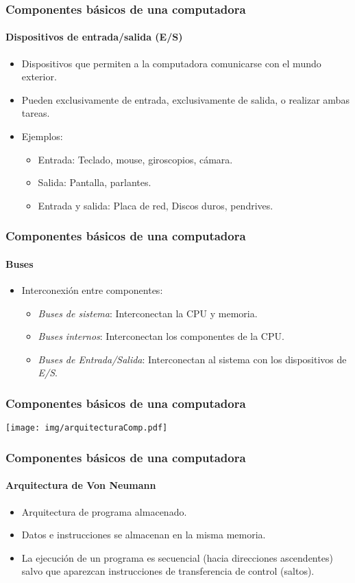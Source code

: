 \documentclass[11pt,a4paper,spanish]{beamer}
\begin{document}
\begin{frame}
    \frametitle{Componentes básicos de una computadora}
    \framesubtitle{Dispositivos de entrada/salida (E/S)}
    \pause
    \begin{itemize}
        \item Dispositivos que permiten a la computadora comunicarse con el
            mundo exterior. \pause
        \item Pueden exclusivamente de entrada, exclusivamente de salida, o
            realizar ambas tareas. \pause
        \item Ejemplos:
        \begin{itemize}
            \item Entrada: Teclado, mouse, giroscopios, cámara.
            \item Salida: Pantalla, parlantes.
            \item Entrada y salida: Placa de red, Discos duros, pendrives.
        \end{itemize}
    \end{itemize}
\end{frame}

\begin{frame}
    \frametitle{Componentes básicos de una computadora}
    \framesubtitle{Buses}
    \pause
    \begin{itemize}
        \item Interconexión entre componentes:\pause
        \begin{itemize}
            \item \emph{Buses de sistema}: Interconectan la CPU y memoria.
            \item \emph{Buses internos}: Interconectan los componentes de la
                CPU.
            \item \emph{Buses de Entrada/Salida}: Interconectan al sistema con
                los dispositivos de \emph{E/S}.
        \end{itemize}
    \end{itemize}
\end{frame}

\begin{frame}
    \frametitle{Componentes básicos de una computadora}
    \centering
    \texttt{[image: img/arquitecturaComp.pdf]}
\end{frame}

\begin{frame}
    \frametitle{Componentes básicos de una computadora}
    \framesubtitle{Arquitectura de Von Neumann}
    \pause
    \begin{itemize}
        \item Arquitectura de programa almacenado. \pause
        \item Datos e instrucciones se almacenan en la misma memoria. \pause
        \item La ejecución de un programa es secuencial (hacia direcciones
            ascendentes) salvo que aparezcan instrucciones de transferencia de
            control (saltos).
    \end{itemize}
\end{frame}
\end{document}
